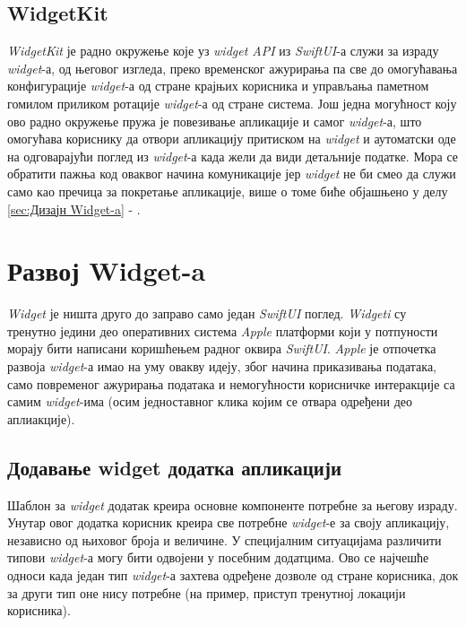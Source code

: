 \documentclass[12pt,oneside]{memoir}
\begin{document}
\subsection{WidgetKit}
\indent \textit{WidgetKit} је радно окружење које уз \textit{widget API} из  \textit{SwiftUI}-а служи за израду \textit{widget}-а, од његовог изгледа, преко временског ажурирања па све до омогућавања конфигурације \textit{widget}-а од стране крајњих корисника и управљања паметном гомилом приликом ротације \textit{widget}-а од стране система. Још једна могућност коју ово радно окружење пружа је повезивање апликације и самог \textit{widget}-а, што омогућава кориснику да отвори апликацију притиском на \textit{widget} и аутоматски оде на одговарајући поглед из \textit{widget}-а када жели да види детаљније податке. Мора се обратити пажња код оваквог начина комуникације јер \textit{widget} не би смео да служи само као пречица за покретање апликације, више о томе биће објашњено у делу \ref{sec:Дизајн Widget-a} - .

\section{Развој Widget-a}
\label{sec:Развој Widget-a}
\indent \textit{Widget} је ништа друго до заправо само један \textit{SwiftUI} поглед. \textit{Widgeti} су тренутно једини део оперативних система \textit{Apple} платформи који у потпуности морају бити написани коришћењем радног оквира \textit{SwiftUI}. \textit{Apple} је отпочетка развоја \textit{widget}-а имао на уму овакву идеју, због начина приказивања података, само повременог ажурирања података и немогућности корисничке интеракције са самим \textit{widget}-има (осим једноставног клика којим се отвара одређени део аплиакције).

\subsection{Додавање widget додатка апликацији}
\indent Шаблон за \textit{widget} додатак креира основне компоненте потребне за његову израду. Унутар овог додатка корисник креира све потребне \textit{widget}-е за своју апликацију, независно од њиховог броја и величине. У специјалним ситуацијама различити типови \textit{widget}-а могу бити одвојени у посебним додатцима. Ово се најчешће односи када један тип \textit{widget}-а захтева одређене дозволе од стране корисника, док за други тип оне нису потребне (на пример, приступ тренутној локацији корисника).
\end{document}
